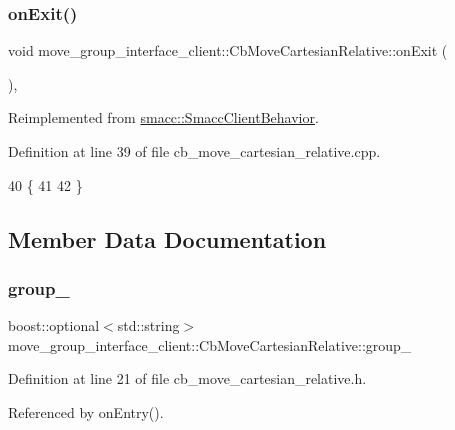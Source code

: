 \subsubsection{\texorpdfstring{on\+Exit()}{onExit()}}
{\footnotesize\ttfamily void move\+\_\+group\+\_\+interface\+\_\+client\+::\+Cb\+Move\+Cartesian\+Relative\+::on\+Exit (\begin{DoxyParamCaption}{ }\end{DoxyParamCaption})\hspace{0.3cm}{\ttfamily [override]}, {\ttfamily [virtual]}}



Reimplemented from \hyperlink{classsmacc_1_1SmaccClientBehavior_ac0cd72d42bd00425362a97c9803ecce5}{smacc\+::\+Smacc\+Client\+Behavior}.



Definition at line 39 of file cb\+\_\+move\+\_\+cartesian\+\_\+relative.\+cpp.


\begin{DoxyCode}
40 \{
41     
42 \}
\end{DoxyCode}


\subsection{Member Data Documentation}
\mbox{\label{classmove__group__interface__client_1_1CbMoveCartesianRelative_a5da33d1b7d822c971f8e282e5ade7238}} 
\subsubsection{\texorpdfstring{group\+\_\+}{group\_}}
{\footnotesize\ttfamily boost\+::optional$<$std\+::string$>$ move\+\_\+group\+\_\+interface\+\_\+client\+::\+Cb\+Move\+Cartesian\+Relative\+::group\+\_\+}



Definition at line 21 of file cb\+\_\+move\+\_\+cartesian\+\_\+relative.\+h.



Referenced by on\+Entry().

